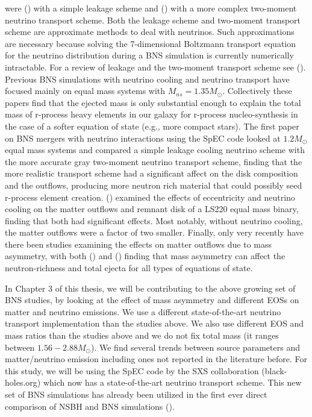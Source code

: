 were (\citet*{neilsen2014magnetized, palenzuela2015effects}) with a simple leakage scheme and (\citet*{sekiguchi2015dynamical}) with a more complex two-moment neutrino transport scheme. Both the leakage scheme and two-moment transport scheme are approximate methods to deal with neutrinos. Such approximations are necessary because solving the 7-dimensional Boltzmann transport equation for the neutrino distribution during a BNS simulation is currently numerically intractable. For a review of leakage and the two-moment transport scheme see (\citet*{foucart2015post}). Previous BNS simulations with neutrino cooling and neutrino transport have focused mainly on equal mass systems with $M_{ns} = 1.35M_{\odot}$. Collectively these papers find that the ejected mass is only substantial  enough to explain the total mass of r-process heavy elements in our galaxy for r-process nucleo-synthesis in the case of a softer equation of state (e.g., more compact stars). The first paper on BNS mergers with neutrino interactions using the SpEC code looked at $1.2M_{\odot}$ equal mass systems and compared a simple leakage cooling neutrino scheme with the more accurate gray two-moment neutrino transport scheme, finding that the more realistic transport scheme had a significant affect on the disk composition and the outflows, producing more neutron rich material that could possibly seed r-process element creation. (\citet*{radice2016dynamical}) examined the effects of eccentricity and neutrino cooling on the matter outflows and remnant disk of a LS220 equal mass binary, finding that both had significant effects. Most notably, without neutrino cooling, the matter outflows were a factor of two smaller. Finally, only very recently have there been studies examining the effects on matter outflows due to mass asymmetry, with both (\citet*{lehner2016unequal}) and (\citet*{sekiguchi2016dynamical}) finding that mass asymmetry can affect the neutron-richness and total ejecta for all types of equations of state.

In Chapter 3 of this thesis, we will be contributing to the above growing set of BNS studies, by looking at the effect of mass asymmetry and different EOSs on matter and neutrino emissions. We use a different state-of-the-art neutrino transport implementation than the studies above. We also use different EOS and mass ratios than the studies above and we do not fix total mass (it ranges between $1.56-2.88M_\odot$). We find several trends between source parameters and matter/neutrino emission including ones not reported in the literature before. For this study, we will be using the SpEC code by the SXS collaboration (black-holes.org) which now has a state-of-the-art neutrino transport scheme. This new set of BNS simulations has already been utilized in the first ever direct comparison of NSBH and BNS simulations (\citet*{2018arxiv180803836h}).


